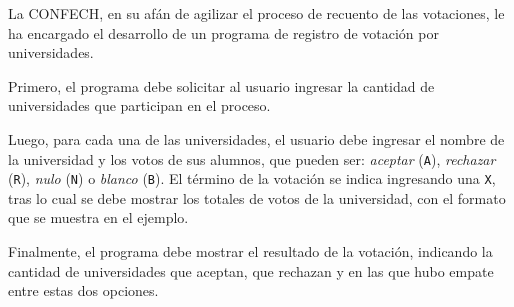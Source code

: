 La CONFECH,
en su afán de agilizar el proceso de recuento de las votaciones,
le ha encargado el desarrollo de un programa de registro de votación por universidades.

\begin{minipage}[t]{.5\textwidth}
  Primero, el programa debe solicitar al usuario ingresar
  la cantidad de universidades que participan en el proceso.
  \vspace{1ex}

  Luego, para cada una de las universidades,
  el usuario debe ingresar
  el nombre de la universidad
  y los votos de sus alumnos, que pueden ser:
  \emph{aceptar} (\texttt{A}),
  \emph{rechazar} (\texttt{R}),
  \emph{nulo} (\texttt{N}) o
  \emph{blanco} (\texttt{B}).
  El término de la votación se indica ingresando una \texttt{X},
  tras lo cual se debe mostrar los totales de votos de la universidad,
  con el formato que se muestra en el ejemplo.
  \vspace{1ex}

  Finalmente,
  el programa debe mostrar el resultado de la votación,
  indicando la cantidad de universidades que aceptan, que rechazan
  y en las que hubo empate entre estas dos opciones.

\end{minipage}
\hfill
\begin{minipage}[t]{.4\textwidth}
  
\end{minipage}

